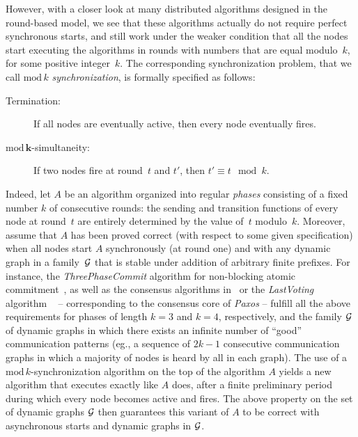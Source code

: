 \documentclass{article}
\begin{document}
However, with a closer look at many distributed algorithms designed in the round-based model,  we see that
	these algorithms actually  do not require perfect synchronous starts, and still work under the weaker condition that all the nodes
	start executing the algorithms in rounds with numbers that are equal modulo~$k$, for some positive integer~$k$.
The corresponding synchronization problem, that we call ${\mathrm{mod}\,k}$  \emph{synchronization}, is formally specified as follows:
	\begin{description}
	\item[Termination:]   If all nodes are eventually active, then  every node eventually fires.
	\item[ $\mathbf{\mathrm{mod}\,k}$-simultaneity:]  If two nodes fire at round~$t$ and $t'$, then $t' \equiv t \mod k$.
	\end{description}

Indeed, let $A$ be an algorithm  organized into regular  \emph{phases} consisting of  a fixed number  $k$ of consecutive rounds:
	the sending and transition functions of every node at round~$t$ are entirely determined by the value of~$t$ modulo~$k$.
Moreover, assume that $A$ has been proved correct (with respect to some given specification) when all nodes start $A$
	synchronously (at round one) and with any dynamic graph in a family~${\cal G}$ that is stable  under
	addition of arbitrary finite prefixes.
For instance, the \emph{ThreePhaseCommit} algorithm for non-blocking atomic commitment~\cite{BHG87},
	as well as the consensus algorithms in~\cite{DLS88} or the \emph{LastVoting} algorithm ~\cite{CBS09}
	-- corresponding to the consensus core of \emph{Paxos} -- fulfill all the above requirements
	for phases of length $k=3$ and $k=4$, respectively, and the family ${\cal G}$ of dynamic graphs in which
	there exists an infinite number of ``good'' communication patterns
	(eg., a sequence of $2k-1$ consecutive communication graphs  in which a majority of nodes is heard by all
	in   each graph).
The use of a ${\mathrm{mod}\,k}$-synchronization algorithm on the top of the algorithm $A$ yields a new algorithm that executes
	exactly like $A$ does, after a finite preliminary period during which every node becomes active and fires.
The above property on the set of dynamic graphs ${\cal G}$ then guarantees this variant of $A$ to be correct with
	asynchronous starts and dynamic graphs in ${\cal G}$.
\end{document}
